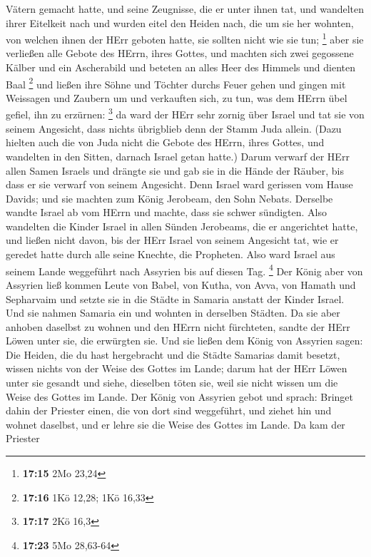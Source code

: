 Vätern gemacht hatte, und seine Zeugnisse, die er unter ihnen tat, und
wandelten ihrer Eitelkeit nach und wurden eitel den Heiden nach, die um
sie her wohnten, von welchen ihnen der HErr geboten hatte, sie sollten
nicht wie sie tun; \footnote{\textbf{17:15} 2Mo 23,24} 
aber sie verließen alle Gebote des HErrn, ihres Gottes, und machten sich
zwei gegossene Kälber und ein Ascherabild und beteten an alles Heer des
Himmels und dienten Baal \footnote{\textbf{17:16} 1Kö 12,28; 1Kö 16,33}
 und ließen ihre Söhne und Töchter durchs Feuer gehen und
gingen mit Weissagen und Zaubern um und verkauften sich, zu tun, was dem
HErrn übel gefiel, ihn zu erzürnen: \footnote{\textbf{17:17} 2Kö 16,3}
 da ward der HErr sehr zornig über Israel und tat sie von
seinem Angesicht, dass nichts übrigblieb denn der Stamm Juda allein.
 (Dazu hielten auch die von Juda nicht die Gebote des
HErrn, ihres Gottes, und wandelten in den Sitten, darnach Israel getan
hatte.)  Darum verwarf der HErr allen Samen Israels und
drängte sie und gab sie in die Hände der Räuber, bis dass er sie verwarf
von seinem Angesicht.  Denn Israel ward gerissen vom Hause
Davids; und sie machten zum König Jerobeam, den Sohn Nebats. Derselbe
wandte Israel ab vom HErrn und machte, dass sie schwer sündigten.
 Also wandelten die Kinder Israel in allen Sünden
Jerobeams, die er angerichtet hatte, und ließen nicht davon,
 bis der HErr Israel von seinem Angesicht tat, wie er
geredet hatte durch alle seine Knechte, die Propheten. Also ward Israel
aus seinem Lande weggeführt nach Assyrien bis auf diesen Tag.
\footnote{\textbf{17:23} 5Mo 28,63-64}  Der König aber von
Assyrien ließ kommen Leute von Babel, von Kutha, von Avva, von Hamath
und Sepharvaim und setzte sie in die Städte in Samaria anstatt der
Kinder Israel. Und sie nahmen Samaria ein und wohnten in derselben
Städten.  Da sie aber anhoben daselbst zu wohnen und den
HErrn nicht fürchteten, sandte der HErr Löwen unter sie, die erwürgten
sie.  Und sie ließen dem König von Assyrien sagen: Die
Heiden, die du hast hergebracht und die Städte Samarias damit besetzt,
wissen nichts von der Weise des Gottes im Lande; darum hat der HErr
Löwen unter sie gesandt und siehe, dieselben töten sie, weil sie nicht
wissen um die Weise des Gottes im Lande.  Der König von
Assyrien gebot und sprach: Bringet dahin der Priester einen, die von
dort sind weggeführt, und ziehet hin und wohnet daselbst, und er lehre
sie die Weise des Gottes im Lande.  Da kam der Priester
